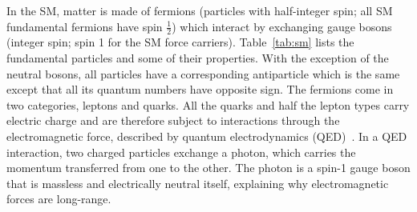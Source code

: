In the SM, matter is made of fermions (particles with half-integer spin; all SM fundamental fermions have spin $\frac{1}{2}$) which interact by exchanging gauge bosons (integer spin; spin 1 for the SM force carriers).
Table~\ref{tab:sm} lists the fundamental particles and some of their properties.
With the exception of the neutral bosons, all particles have a corresponding antiparticle which is the same except that all its quantum numbers have opposite sign.
The fermions come in two categories, leptons and quarks.
All the quarks and half the lepton types carry electric charge and are therefore subject to interactions through the electromagnetic force, described by quantum electrodynamics (QED)~\cite{Halzen:1984mc}.
In a QED interaction, two charged particles exchange a photon, which carries the momentum transferred from one to the other.
The photon is a spin-1 gauge boson that is massless and electrically neutral itself, explaining why electromagnetic forces are long-range.
%

